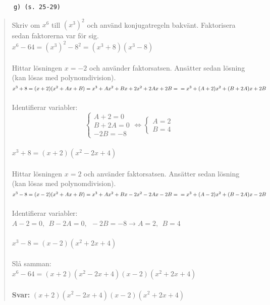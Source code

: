 \documentclass[a4paper]{article}
\newcommand{\tskcol}[1]{\textcolor{tskcol}{#1}}
\begin{document}
	\pagebreak
	\texttt{\tskcol{~~~~~~g) (s. 25-29)}}
	\begin{quotation}
		\noindent
		Skriv om $x^6$ till $(x^3)^2$ och använd konjugatregeln bakvänt. Faktorisera sedan faktorerna var för sig. \\
		$x^6-64=(x^3)^2-8^2=(x^3+8)(x^3-8)$ \\ \\
		Hittar lösningen $x=-2$ och använder faktorsatsen. Ansätter sedan lösning (kan lösas med polynomdivision).\\
		$x^3+8=(x+2)(x^2+Ax+B)=x^3+Ax^2+Bx+2x^2+2Ax+2B= \\
		=x^3+(A+2)x^2+(B+2A)x+2B$ \\ \\
		Identifierar variabler: \\
		\[\begin{cases}
		A+2=0 \\
		B+2A=0 \\
		-2B=-8
		\end{cases}
		\Leftrightarrow
		\begin{cases}
		A=2 \\
		B=4 
		\end{cases}\] \\
		$x^3+8=(x+2)(x^2-2x+4)$ \\ \\
		Hittar lösningen $x=2$ och använder faktorsatsen. Ansätter sedan lösning (kan lösas med polynomdivision).\\
		$x^3-8=(x-2)(x^2+Ax+B)=x^3+Ax^2+Bx-2x^2-2Ax-2B= \\
		=x^3+(A-2)x^2+(B-2A)x-2B$ \\ \\
		Identifierar variabler: \\
		$A-2=0,~~B-2A=0,~~-2B=-8 \rightarrow A=2,~~B=4$ \\ \\
		$x^3-8=(x-2)(x^2+2x+4)$ \\ \\
		Slå samman: \\
		$x^6-64=(x+2)(x^2-2x+4)(x-2)(x^2+2x+4)$
		\\ \\
		\textbf{Svar:} $(x+2)(x^2-2x+4)(x-2)(x^2+2x+4)$
	\end{quotation}
	
\end{document}
